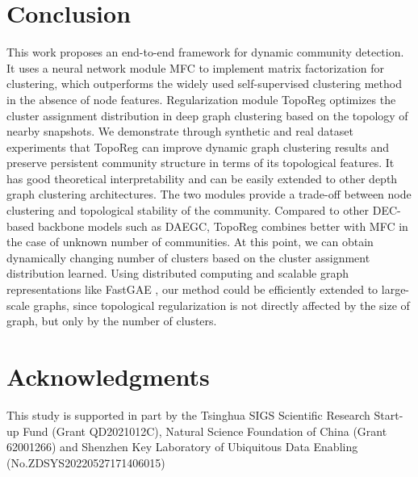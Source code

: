 \documentclass[letterpaper]{article} %
\begin{document}
\begin{table}[]
\caption{Experimental results on dataset with unknown cluster number. The label of the corresponding node is assigned as the index of the row maximum in cluster assignment distribution matrix.}

\label{table:Q}
\end{table}



\section{Conclusion}
This work proposes an end-to-end  framework for dynamic community detection. It uses a neural network module MFC to implement matrix factorization for clustering, which outperforms the widely used self-supervised clustering method in the absence of node features. Regularization module TopoReg optimizes the cluster assignment distribution in deep graph clustering based on the topology of nearby snapshots. We demonstrate through synthetic and real dataset experiments that TopoReg can improve dynamic graph clustering results and preserve persistent community structure in terms of its  topological features. It has good theoretical interpretability and can be easily extended to other depth graph clustering architectures. The two modules provide a trade-off between node clustering and topological stability of the community. Compared to other DEC-based backbone models such as DAEGC, TopoReg combines better with MFC in the case of unknown number of communities. At this point, we can obtain dynamically changing number of clusters based on the cluster assignment distribution learned. Using distributed computing and scalable graph representations like FastGAE \cite{fastgae}, our method could be efficiently extended to large-scale graphs, since topological regularization is not directly affected by the size of graph, but only by the number of clusters.

\section{Acknowledgments}
This study is supported in part by the Tsinghua SIGS Scientific Research Start-up Fund (Grant QD2021012C), Natural Science Foundation of China (Grant 62001266) and Shenzhen Key Laboratory of Ubiquitous Data Enabling (No.ZDSYS20220527171406015)


\end{document}
